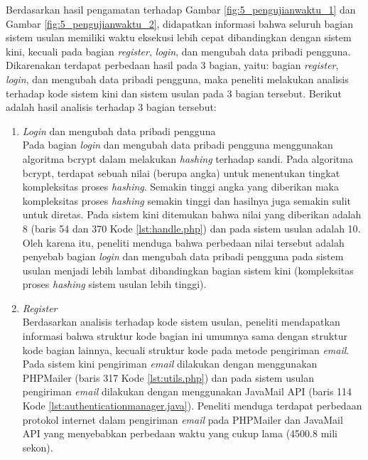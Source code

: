 Berdasarkan hasil pengamatan terhadap Gambar \ref{fig:5_pengujianwaktu_1} dan Gambar \ref{fig:5_pengujianwaktu_2}, didapatkan informasi bahwa seluruh bagian sistem usulan memiliki waktu eksekusi lebih cepat dibandingkan dengan sistem kini, kecuali pada bagian \textit{register}, \textit{login}, dan mengubah data pribadi pengguna. Dikarenakan terdapat perbedaan hasil pada 3 bagian, yaitu: bagian \textit{register}, \textit{login}, dan mengubah data pribadi pengguna, maka peneliti melakukan analisis terhadap kode sistem kini dan sistem usulan pada 3 bagian tersebut. Berikut adalah hasil analisis terhadap 3 bagian tersebut:
\begin{enumerate}
	\item \textit{Login} dan mengubah data pribadi pengguna\\
	Pada bagian \textit{login} dan mengubah data pribadi pengguna menggunakan algoritma bcrypt dalam melakukan \textit{hashing} terhadap sandi. Pada algoritma bcrypt, terdapat sebuah nilai (berupa angka) untuk menentukan tingkat kompleksitas proses \textit{hashing}\cite{jbcrypt}. Semakin tinggi angka yang diberikan maka kompleksitas proses \textit{hashing} semakin tinggi dan hasilnya juga semakin sulit untuk diretas. Pada sistem kini ditemukan bahwa nilai yang diberikan adalah 8 (baris 54 dan 370 Kode \ref{lst:handle.php}) dan pada sistem usulan adalah 10\cite{jbcrypt}. Oleh karena itu, peneliti menduga bahwa perbedaan nilai tersebut adalah penyebab bagian \textit{login} dan mengubah data pribadi pengguna pada sistem usulan menjadi lebih lambat dibandingkan bagian sistem kini (kompleksitas proses \textit{hashing} sistem usulan lebih tinggi).
	\item \textit{Register}\\
	Berdasarkan analisis terhadap kode sistem usulan, peneliti mendapatkan informasi bahwa struktur kode bagian ini umumnya sama dengan struktur kode bagian lainnya, kecuali struktur kode pada metode pengiriman \textit{email}. Pada sistem kini pengiriman \textit{email} dilakukan dengan menggunakan PHPMailer (baris 317 Kode \ref{lst:utils.php}) dan pada sistem usulan pengiriman \textit{email} dilakukan dengan menggunakan JavaMail API (baris 114 Kode \ref{lst:authenticationmanager.java}).  Peneliti menduga terdapat perbedaan protokol internet dalam pengiriman \textit{email} pada PHPMailer dan JavaMail API yang menyebabkan perbedaan waktu yang cukup lama (4500.8 mili sekon). 
\end{enumerate}

